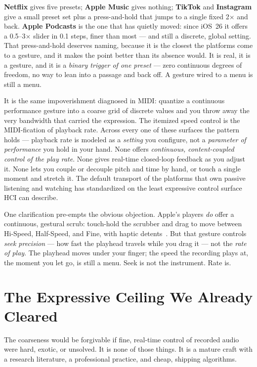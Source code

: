 \documentclass[10pt,letterpaper,twocolumn]{article}
\begin{document}
\textbf{Netflix} gives five presets; \textbf{Apple Music} gives nothing; \textbf{TikTok} and \textbf{Instagram} give a small preset set plus a press-and-hold that jumps to a single fixed 2$\times$ and back. \textbf{Apple Podcasts} is the one that has quietly moved: since iOS~26 it offers a 0.5--3$\times$ slider in 0.1 steps, finer than most --- and still a discrete, global setting. That press-and-hold deserves naming, because it is the closest the platforms come to a gesture, and it makes the point better than its absence would. It is real, it is a gesture, and it is a \emph{binary trigger of one preset} --- zero continuous degrees of freedom, no way to lean into a passage and back off. A gesture wired to a menu is still a menu.

It is the same impoverishment \citet{moore1988dysfunctions} diagnosed in MIDI: quantize a continuous performance gesture into a coarse grid of discrete values and you throw away the very bandwidth that carried the expression. The itemized speed control is the MIDI-fication of playback rate. Across every one of these surfaces the pattern holds --- playback rate is modeled as a \emph{setting} you configure, not a \emph{parameter of performance} you hold in your hand. None offers \emph{continuous, content-coupled control of the play rate}. None gives real-time closed-loop feedback as you adjust it. None lets you couple or decouple pitch and time by hand, or touch a single moment and stretch it. The default transport of the platforms that own passive listening and watching has standardized on the least expressive control surface HCI can describe.

One clarification pre-empts the obvious objection. Apple's players \emph{do} offer a continuous, gestural scrub: touch-hold the scrubber and drag to move between Hi-Speed, Half-Speed, and Fine, with haptic detents~\citep{apple2026scrubbing}. But that gesture controls \emph{seek precision} --- how fast the playhead travels while you drag it --- not the \emph{rate of play}. The playhead moves under your finger; the speed the recording plays at, the moment you let go, is still a menu. Seek is not the instrument. Rate is.

\section{The Expressive Ceiling We Already Cleared}

The coarseness would be forgivable if fine, real-time control of recorded audio were hard, exotic, or unsolved. It is none of those things. It is a mature craft with a research literature, a professional practice, and cheap, shipping algorithms.
\end{document}
